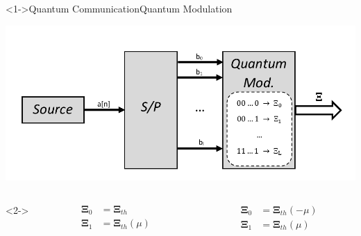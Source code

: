 \begin{frame}<1->{Quantum Communication}{Quantum Modulation}
    \begin{center}
        \includegraphics[width=0.85\linewidth]{Pictures/fig2.1.pdf}
    \end{center}
    \begin{columns}<2->
        \begin{column}{0.5\linewidth}
            \begin{equation*}\begin{split}
                \pmb{\Xi}_0 &= \pmb{\Xi}_{th}\\
                \pmb{\Xi}_1 &= \pmb{\Xi}_{th}(\mu)
            \end{split}\end{equation*}
        \end{column}
        \begin{column}{0.5\linewidth}
            \begin{equation*}\begin{split}
                \pmb{\Xi}_0 &= \pmb{\Xi}_{th}(-\mu)\\
                \pmb{\Xi}_1 &= \pmb{\Xi}_{th}(\mu)
            \end{split}\end{equation*}
        \end{column}
    \end{columns}
    \ \\ \mbox{}\\ \mbox{}\\ \mbox{}
\end{frame}